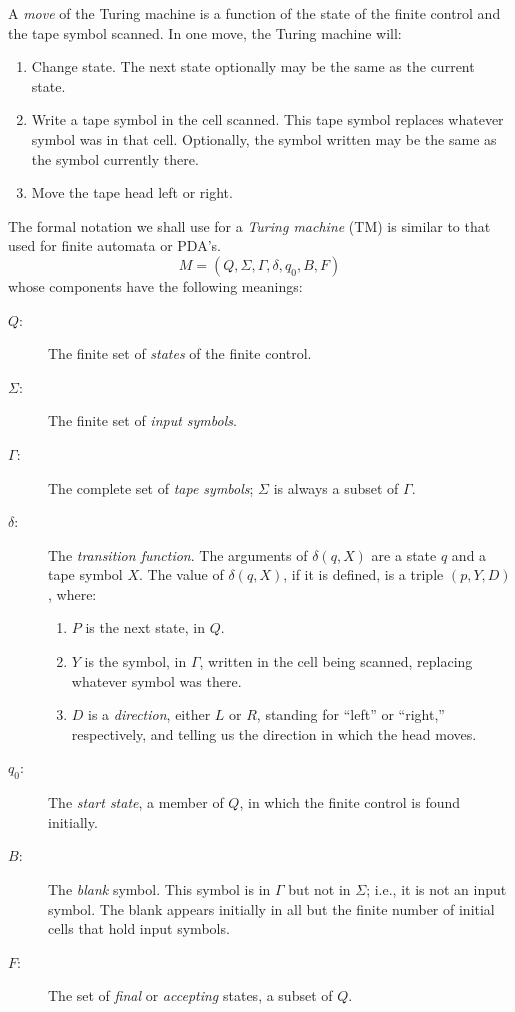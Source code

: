 \documentclass[]{article}
\begin{document}
A \emph{move} of the Turing machine is a function of the state of the
finite control and the tape symbol scanned. In one move, the Turing machine
will:
\begin{enumerate}
\item Change state. The next state optionally may be the same as the
current state.
\item Write a tape symbol in the cell scanned. This tape symbol
replaces whatever symbol was in that cell. Optionally, the symbol
written may be the same as the symbol currently there.
\item Move the tape head left or right.
\end{enumerate}

The formal notation we shall use for a \emph{Turing machine} (TM) is
similar to that used for finite automata or PDA's.
\[ M = (Q,\Sigma,\Gamma,\delta,q_0,B,F) \]
whose components have the following meanings:
\begin{description}
\item[$Q$:] The finite set of \emph{states} of the finite control.
\item[$\Sigma$:] The finite set of \emph{input symbols}.
\item[$\Gamma$:] The complete set of \emph{tape symbols}; $\Sigma$ is
always a subset of $\Gamma$.
\item[$\delta$:] The \emph{transition function}. The arguments of
$\delta(q,X)$ are a state $q$ and a tape symbol $X$. The value of
$\delta(q,X)$, if it is defined, is a triple $(p,Y,D)$, where:
\begin{enumerate}
\item $P$ is the next state, in $Q$.
\item $Y$ is the symbol, in $\Gamma$, written in the cell being
scanned, replacing whatever symbol was there.
\item $D$ is a \emph{direction}, either $L$ or $R$, standing for
``left'' or ``right,'' respectively, and telling us the direction
in which the head moves.
\end{enumerate}
\item[$q_0$:] The \emph{start state}, a member of $Q$, in which the
finite control is found initially.
\item[$B$:] The \emph{blank} symbol. This symbol is in $\Gamma$ but not
in $\Sigma$; i.e., it is not an input symbol. The blank appears
initially in all but the finite number of initial cells that hold input
symbols.
\item[$F$:] The set of \emph{final} or \emph{accepting} states, a
subset of $Q$.
\end{description}
\end{document}
